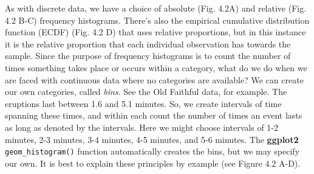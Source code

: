 \documentclass[english,10pt,a4paper,oneside]{book}
\theoremstyle{definition}
\theoremstyle{definition}
\theoremstyle{definition}
\theoremstyle{remark}
\begin{document}
As with discrete data, we have a choice of absolute (Fig. 4.2A) and
relative (Fig. 4.2 B-C) frequency histograms. There's also the empirical
cumulative distribution function (ECDF) (Fig. 4.2 D) that uses relative
proportions, but in this instance it is the relative proportion that
each individual observation has towards the sample. Since the purpose of
frequency histograms is to count the number of times something takes
place or occurs within a category, what do we do when we are faced with
continuous data where no categories are available? We can create our own
categories, called \emph{bins}. See the Old Faithful data, for example.
The eruptions last between 1.6 and 5.1 minutes. So, we create intervals
of time spanning these times, and within each count the number of times
an event lasts as long as denoted by the intervals. Here we might choose
intervals of 1-2 minutes, 2-3 minutes, 3-4 minutes, 4-5 minutes, and 5-6
minutes. The \textbf{ggplot2} \texttt{geom\_histogram()} function
automatically creates the bins, but we may specify our own. It is best
to explain these principles by example (see Figure 4.2 A-D).
\end{document}
